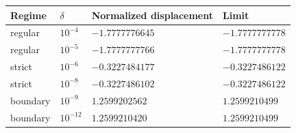 \begin{center}
\begin{tabular}{@{}llll@{}}
\toprule
Regime & \(\delta\) & Normalized displacement & Limit\\
\midrule
regular & \(10^{-4}\) & \(-1.7777776645\) & \(-1.7777777778\)\\
regular & \(10^{-5}\) & \(-1.7777777766\) & \(-1.7777777778\)\\
strict & \(10^{-6}\) & \(-0.3227484177\) & \(-0.3227486122\)\\
strict & \(10^{-8}\) & \(-0.3227486102\) & \(-0.3227486122\)\\
boundary & \(10^{-9}\) & \(1.2599202562\) & \(1.2599210499\)\\
boundary & \(10^{-12}\) & \(1.2599210420\) & \(1.2599210499\)\\
\bottomrule
\end{tabular}
\end{center}
